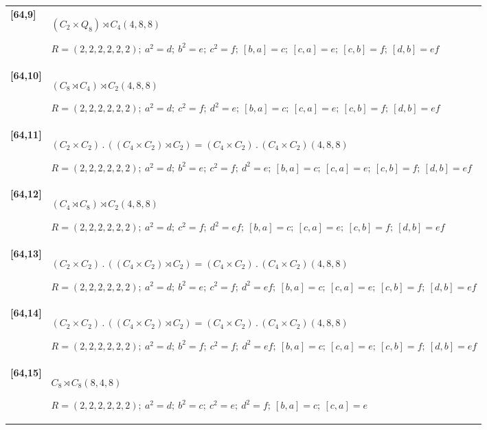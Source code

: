 \documentclass[UTF8,fontset=fandol,11pt,a4paper]{ctexart}
\begin{document}
\begin{longtable}{@{}p{17mm}>{\raggedright\arraybackslash}p{141mm}@{}}
\textbf{[64,9]} & $(C_{2}\times Q_{8})\rtimes C_{4}$\quad $(4,8,8)$\par\(R=(2,2,2,2,2,2);\allowbreak\ a^{2}=d;\allowbreak\ b^{2}=e;\allowbreak\ c^{2}=f;\allowbreak\ [b,a]=c;\allowbreak\ [c,a]=e;\allowbreak\ [c,b]=f;\allowbreak\ [d,b]=ef\)\\[3pt]

\textbf{[64,10]} & $(C_{8}\rtimes C_{4})\rtimes C_{2}$\quad $(4,8,8)$\par\(R=(2,2,2,2,2,2);\allowbreak\ a^{2}=d;\allowbreak\ c^{2}=f;\allowbreak\ d^{2}=e;\allowbreak\ [b,a]=c;\allowbreak\ [c,a]=e;\allowbreak\ [c,b]=f;\allowbreak\ [d,b]=ef\)\\[3pt]

\textbf{[64,11]} & $(C_{2}\times C_{2})\mathbin{.} ((C_{4}\times C_{2})\rtimes C_{2}) = (C_{4}\times C_{2})\mathbin{.} (C_{4}\times C_{2})$\quad $(4,8,8)$\par\(R=(2,2,2,2,2,2);\allowbreak\ a^{2}=d;\allowbreak\ b^{2}=e;\allowbreak\ c^{2}=f;\allowbreak\ d^{2}=e;\allowbreak\ [b,a]=c;\allowbreak\ [c,a]=e;\allowbreak\ [c,b]=f;\allowbreak\ [d,b]=ef\)\\[3pt]

\textbf{[64,12]} & $(C_{4}\rtimes C_{8})\rtimes C_{2}$\quad $(4,8,8)$\par\(R=(2,2,2,2,2,2);\allowbreak\ a^{2}=d;\allowbreak\ c^{2}=f;\allowbreak\ d^{2}=ef;\allowbreak\ [b,a]=c;\allowbreak\ [c,a]=e;\allowbreak\ [c,b]=f;\allowbreak\ [d,b]=ef\)\\[3pt]

\textbf{[64,13]} & $(C_{2}\times C_{2})\mathbin{.} ((C_{4}\times C_{2})\rtimes C_{2}) = (C_{4}\times C_{2})\mathbin{.} (C_{4}\times C_{2})$\quad $(4,8,8)$\par\(R=(2,2,2,2,2,2);\allowbreak\ a^{2}=d;\allowbreak\ b^{2}=e;\allowbreak\ c^{2}=f;\allowbreak\ d^{2}=ef;\allowbreak\ [b,a]=c;\allowbreak\ [c,a]=e;\allowbreak\ [c,b]=f;\allowbreak\ [d,b]=ef\)\\[3pt]

\textbf{[64,14]} & $(C_{2}\times C_{2})\mathbin{.} ((C_{4}\times C_{2})\rtimes C_{2}) = (C_{4}\times C_{2})\mathbin{.} (C_{4}\times C_{2})$\quad $(4,8,8)$\par\(R=(2,2,2,2,2,2);\allowbreak\ a^{2}=d;\allowbreak\ b^{2}=f;\allowbreak\ c^{2}=f;\allowbreak\ d^{2}=ef;\allowbreak\ [b,a]=c;\allowbreak\ [c,a]=e;\allowbreak\ [c,b]=f;\allowbreak\ [d,b]=ef\)\\[3pt]

\textbf{[64,15]} & $C_{8}\rtimes C_{8}$\quad $(8,4,8)$\par\(R=(2,2,2,2,2,2);\allowbreak\ a^{2}=d;\allowbreak\ b^{2}=c;\allowbreak\ c^{2}=e;\allowbreak\ d^{2}=f;\allowbreak\ [b,a]=c;\allowbreak\ [c,a]=e\)\\[3pt]


\end{longtable}
\end{document}
